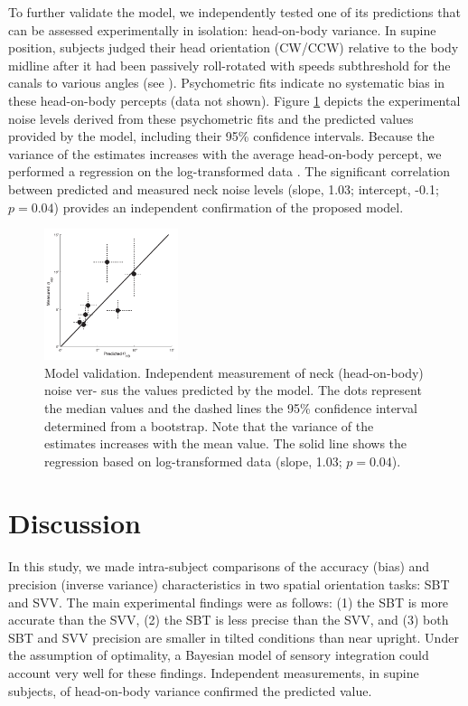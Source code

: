 To further validate the model, we independently tested one of its predictions that can be assessed experimentally in isolation: head-on-body variance. In supine position, subjects judged their head orientation (CW/CCW) relative to the body midline after it had been passively roll-rotated with speeds subthreshold for the canals to various angles (see ). Psychometric fits indicate no systematic bias in these head-on-body percepts (data not shown). Figure \ref{p1:fig6} depicts the experimental noise levels derived from these psychometric fits and the predicted values provided by the model, including their 95\% confidence intervals. Because the variance of the estimates increases with the average head-on-body percept, we performed a regression on the log-transformed data \cite{hopkins2000}. The significant correlation between predicted and measured neck noise levels (slope, 1.03; intercept, -0.1; $p = 0.04$) provides an independent confirmation of the proposed model.

\begin{figure}
    \includegraphics[width=0.35\textwidth]{src/paper1/figure6.pdf}
    
    \caption{Model validation. Independent measurement of neck (head-on-body) noise ver- sus the values predicted by the model. The dots represent the median values and the dashed lines the 95\% confidence interval determined from a bootstrap. Note that the variance of the estimates increases with the mean value. The solid line shows the regression based on log-transformed data (slope, 1.03; $p = 0.04$).}

    \label{p1:fig6}
\end{figure}



\section{Discussion}

In this study, we made intra-subject comparisons of the accuracy (bias) and precision (inverse variance) characteristics in two spatial orientation tasks: SBT and SVV. The main experimental findings were as follows: (1) the SBT is more accurate than the SVV, (2) the SBT is less precise than the SVV, and (3) both SBT and SVV precision are smaller in tilted conditions than near upright. Under the assumption of optimality, a Bayesian model of sensory integration could account very well for these findings. Independent measurements, in supine subjects, of head-on-body variance confirmed the predicted value. 


